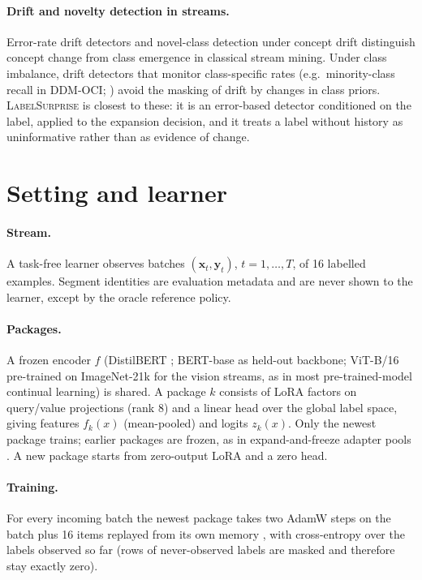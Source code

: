 \documentclass[10pt]{article}
\newcommand{\ls}{\textsc{LabelSurprise}}
\begin{document}
\paragraph{Drift and novelty detection in streams.} Error-rate drift detectors \citep{page1954cusum,gama2004ddm,bifet2007adwin} and novel-class detection under concept drift \citep{masud2011novel} distinguish concept change from class emergence in classical stream mining. Under class imbalance, drift detectors that monitor class-specific rates (e.g.\ minority-class recall in DDM-OCI; \citealp{wang2013ddmoci}) avoid the masking of drift by changes in class priors. \ls{} is closest to these: it is an error-based detector conditioned on the label, applied to the expansion decision, and it treats a label without history as uninformative rather than as evidence of change.

\section{Setting and learner}
\label{sec:setting}

\paragraph{Stream.} A task-free learner observes batches $(\mathbf{x}_t,\mathbf{y}_t)$, $t=1,\dots,T$, of 16 labelled examples. Segment identities are evaluation metadata and are never shown to the learner, except by the oracle reference policy.

\paragraph{Packages.} A frozen encoder $f$ (DistilBERT \citep{sanh2019distilbert}; BERT-base \citep{devlin2019bert} as held-out backbone; ViT-B/16 pre-trained on ImageNet-21k \citep{dosovitskiy2021vit} for the vision streams, as in most pre-trained-model continual learning) is shared. A package $k$ consists of LoRA factors \citep{hu2022lora} on query/value projections (rank 8) and a linear head over the global label space, giving features $f_k(x)$ (mean-pooled) and logits $z_k(x)$. Only the newest package trains; earlier packages are frozen, as in expand-and-freeze adapter pools \citep{zhou2024ease,wang2025sema}. A new package starts from zero-output LoRA and a zero head.

\paragraph{Training.} For every incoming batch the newest package takes two AdamW steps on the batch plus 16 items replayed from its own memory \citep{chaudhry2019tiny}, with cross-entropy over the labels observed so far (rows of never-observed labels are masked and therefore stay exactly zero).
\end{document}
